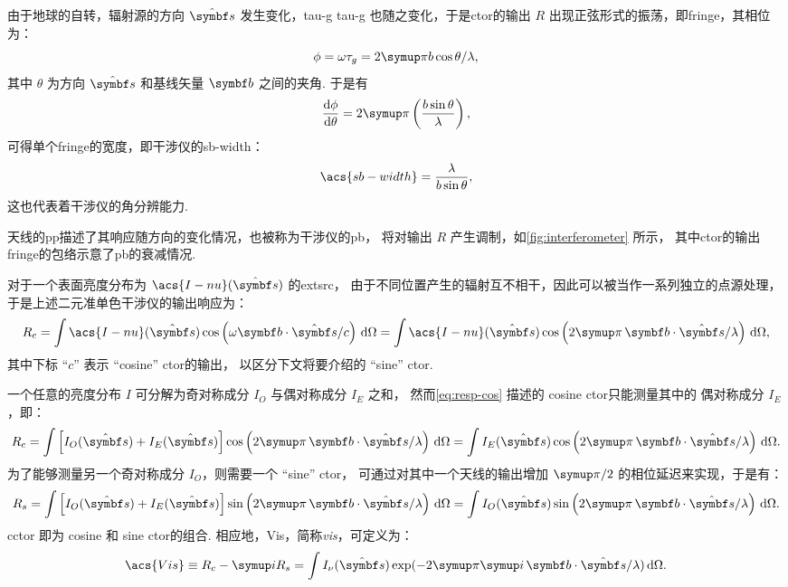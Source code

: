 由于地球的自转，辐射源的方向 $\hat{\B{s}}$ 发生变化，\acl{tau-g} \acs{tau-g}
也随之变化，于是\acl{ctor}的输出 $R$ 出现正弦形式的振荡，即\ac{fringe}，其相位为：
\begin{equation}
  \phi = \omega\tau_g = 2\Cpi b \cos\theta / \lambda,
\end{equation}
其中 $\theta$ 为方向 $\hat{\B{s}}$ 和基线矢量 $\B{b}$ 之间的夹角.
于是有
\begin{equation}
  \diff{\phi}{\theta} = 2\Cpi \left( \frac{b \sin\theta}{\lambda} \right),
\end{equation}
可得单个\acl{fringe}的宽度，即干涉仪的\ac{sb-width}：
\begin{equation}
  \label{eq:sb-width}
  \acs{sb-width} = \frac{\lambda}{b \sin\theta},
\end{equation}
这也代表着干涉仪的角分辨能力.

天线的\ac{pp}描述了其响应随方向的变化情况，也被称为干涉仪的\ac{pb}，
将对输出 $R$ 产生调制，如\autoref{fig:interferometer} 所示，
其中\acl{ctor}的输出\acl{fringe}的包络示意了\acl{pb}的衰减情况.

对于一个表面亮度分布为 $\acs{I-nu}(\hat{\B{s}})$ 的\acl{extsrc}，
由于不同位置产生的辐射互不相干，因此可以被当作一系列独立的点源处理，
于是上述二元准单色干涉仪的输出响应为：
\begin{equation}
  \label{eq:resp-cos}
  R_c = \int \acs{I-nu}(\hat{\B{s}}) \cos \left(
      \omega \B{b}\cdot\hat{\B{s}} / c \right) \D{\Omega}
    = \int \acs{I-nu}(\hat{\B{s}}) \cos \left(
      2\Cpi\, \B{b}\cdot\hat{\B{s}} / \lambda \right) \D{\Omega},
\end{equation}
其中下标 \enquote{$c$} 表示 \enquote{cosine} \acl{ctor}的输出，
以区分下文将要介绍的 \enquote{sine} \acl{ctor}.

一个任意的亮度分布 $I$ 可分解为奇对称成分 $I_O$ 与偶对称成分 $I_E$ 之和，
然而\autoref{eq:resp-cos} 描述的 cosine \acl{ctor}只能测量其中的
偶对称成分 $I_E$，即：
\begin{equation}
  R_c = \int \left[ I_O(\hat{\B{s}}) + I_E(\hat{\B{s}}) \right]
      \cos \left( 2\Cpi\, \B{b}\cdot\hat{\B{s}} / \lambda \right)
      \D{\Omega}
    = \int I_E(\hat{\B{s}}) \cos \left(
      2\Cpi\, \B{b}\cdot\hat{\B{s}} / \lambda \right) \D{\Omega}.
\end{equation}
为了能够测量另一个奇对称成分 $I_O$，则需要一个 \enquote{sine} \acl{ctor}，
可通过对其中一个天线的输出增加 $\Cpi/2$ 的相位延迟来实现，于是有：
\begin{equation}
  R_s = \int \left[ I_O(\hat{\B{s}}) + I_E(\hat{\B{s}}) \right]
      \sin \left( 2\Cpi\, \B{b}\cdot\hat{\B{s}} / \lambda \right)
      \D{\Omega}
    = \int I_O(\hat{\B{s}}) \sin \left(
      2\Cpi\, \B{b}\cdot\hat{\B{s}} / \lambda \right) \D{\Omega}.
\end{equation}
\ac{cctor} 即为 cosine 和 sine \acl{ctor}的组合.
相应地，\ac{Vis}，简称\emph{\acl{vis}}，可定义为：
\begin{equation}
  \label{eq:vis}
  \acs{Vis} \equiv R_c - \Ci R_s
    = \int I_{\nu}(\hat{\B{s}}) \exp
      (-2\Cpi\Ci\, \B{b}\cdot\hat{\B{s}} / \lambda) \D{\Omega}.
\end{equation}

